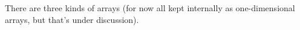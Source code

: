 

\begin{comment}
For now, I suggest we go with a "naive" implementation and try to do only minimal optimizations. 
All arrays are stored in the program as one-dimensional arrays. Arrays lifted from scalars have dimensionality of the loop enclosure in 
the original code, e.g., \texttt{sum!3} is two dimensional \texttt{[N!0,D!0]} (but represented linearly in row-major order; all these "copies" are 
arrays of references to shares). Naturally, all writes into these arrays are canonical writes, i.e., $A[i,j] = ...$ and no things like $A[i+1,j-1] = ...$.

The loop "for j in range..." is perhaps the most interesting. First, consider "projection", e.g., p!3[I,j]. 
We fix j (the current iteration) and iterate over I using the row-major formula; it returns the j-th column, 
a one-dimensional column vector. I think this can be generalized across any mix of vectorized vs. 
non-vectorized dimensions but I'm not 100\% sure.

\begin{verbatim}
// project the (j-1)-st column vector:
A = sum!4[I,j-1]
// project j-th column from p!3: 
B = p!3[I,j] 
// we get a N!0-size vector of references to NEW shares:
C = ADD_SIMD(A,B) 
// Writes j-th column of sum!4 with the new references:
sum!4[I,j] = C 
// may eventually optimize since C is A
\end{verbatim}
\end{comment}
There are three kinds of arrays (for now all kept internally as one-dimensional arrays, but that's under discussion).
